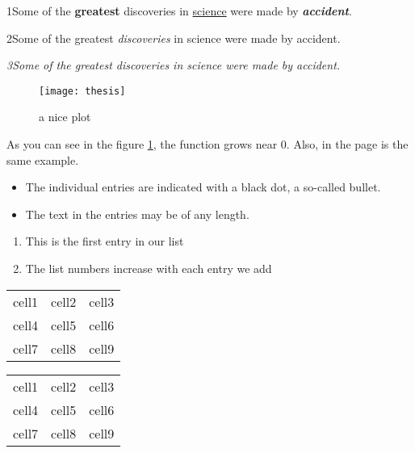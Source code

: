 \documentclass[11pt, a4]{article}
\begin{document}
1Some of the \textbf{greatest} %
discoveries in \underline{science} %
were made by \textbf{\textit{accident}}. %

2Some of the greatest \emph{discoveries} %
in science 
were made by accident.

\textit{3Some of the greatest \emph{discoveries} 
in science 
were made by accident.}

\begin{figure}[h] %
    \centering %
    \texttt{[image: thesis]} %
    \caption{a nice plot} %
    \label{fig:thesis1} %
\end{figure}

As you can see in the figure \ref{fig:thesis1}, the %
function grows near 0. Also, in the page \pageref{fig:thesis1} %
is the same example.

\begin{itemize} %
    \item The individual entries are indicated with a black dot, a so-called bullet.
    \item The text in the entries may be of any length.
\end{itemize}

\begin{enumerate} %
    \item This is the first entry in our list
    \item The list numbers increase with each entry we add
\end{enumerate}

\begin{center}
    \begin{tabular}{ l c r } %
     cell1 & cell2 & cell3 \\ 
     cell4 & cell5 & cell6 \\  
     cell7 & cell8 & cell9    
    \end{tabular}
\end{center}

\begin{center}
    \begin{tabular}{ |c|c|c| } 
     \hline %
     cell1 & cell2 & cell3 \\ 
     cell4 & cell5 & cell6 \\ 
     cell7 & cell8 & cell9 \\ 
     \hline
    \end{tabular}
    \end{center}
\end{document}
